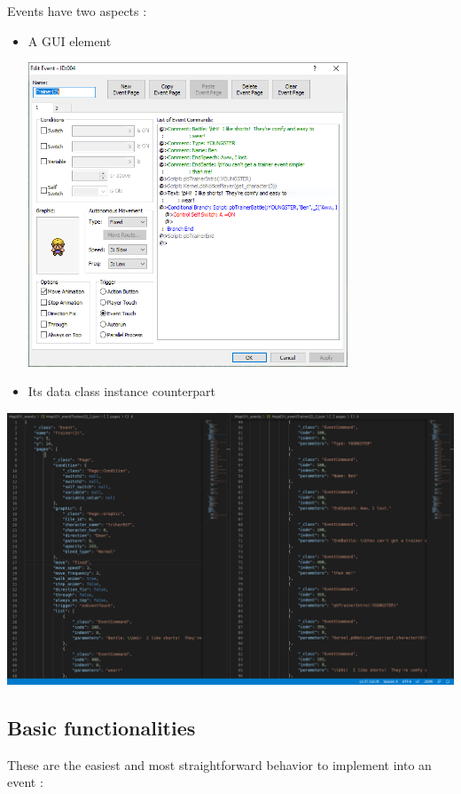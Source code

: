 \documentclass[11pt]{article}
\begin{document}
Events have two aspects :
\begin{itemize}
	\item A GUI element
	\vspace{2mm}
	\begin{center}
		\includegraphics[width=0.75\textwidth]{Event} 
	\end{center}

	\item Its data class instance counterpart
	
	
\end{itemize}
\includegraphics[width=\textwidth]{Event_json}


\subsection{Basic functionalities}

These are the easiest and most straightforward behavior to implement into an event :
\end{document}
